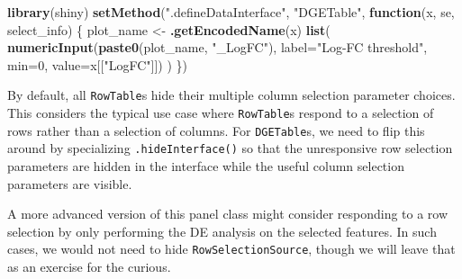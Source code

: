 \documentclass[
]{book}
\newenvironment{Shaded}{\begin{snugshade}}{\end{snugshade}}
\newcommand{\ControlFlowTok}[1]{\textcolor[rgb]{0.13,0.29,0.53}{\textbf{#1}}}
\newcommand{\DataTypeTok}[1]{\textcolor[rgb]{0.13,0.29,0.53}{#1}}
\newcommand{\DecValTok}[1]{\textcolor[rgb]{0.00,0.00,0.81}{#1}}
\newcommand{\KeywordTok}[1]{\textcolor[rgb]{0.13,0.29,0.53}{\textbf{#1}}}
\newcommand{\NormalTok}[1]{#1}
\newcommand{\OperatorTok}[1]{\textcolor[rgb]{0.81,0.36,0.00}{\textbf{#1}}}
\newcommand{\OtherTok}[1]{\textcolor[rgb]{0.56,0.35,0.01}{#1}}
\newcommand{\StringTok}[1]{\textcolor[rgb]{0.31,0.60,0.02}{#1}}
\begin{document}
\begin{Shaded}
\begin{Highlighting}[]
\KeywordTok{library}\NormalTok{(shiny)}
\KeywordTok{setMethod}\NormalTok{(}\StringTok{".defineDataInterface"}\NormalTok{, }\StringTok{"DGETable"}\NormalTok{, }\ControlFlowTok{function}\NormalTok{(x, se, select_info) \{}
\NormalTok{    plot_name <-}\StringTok{ }\KeywordTok{.getEncodedName}\NormalTok{(x)}
    \KeywordTok{list}\NormalTok{(}
        \KeywordTok{numericInput}\NormalTok{(}\KeywordTok{paste0}\NormalTok{(plot_name, }\StringTok{"_LogFC"}\NormalTok{), }\DataTypeTok{label=}\StringTok{"Log-FC threshold"}\NormalTok{,}
            \DataTypeTok{min=}\DecValTok{0}\NormalTok{, }\DataTypeTok{value=}\NormalTok{x[[}\StringTok{"LogFC"}\NormalTok{]])}
\NormalTok{    )}
\NormalTok{\})}
\end{Highlighting}
\end{Shaded}

By default, all \texttt{RowTable}s hide their multiple column selection parameter choices.
This considers the typical use case where \texttt{RowTable}s respond to a selection of rows rather than a selection of columns.
For \texttt{DGETable}s, we need to flip this around by specializing \texttt{.hideInterface()} so that the unresponsive row selection parameters are hidden in the interface while the useful column selection parameters are visible.

\begin{Shaded}
\end{Shaded}

A more advanced version of this panel class might consider responding to a row selection by only performing the DE analysis on the selected features.
In such cases, we would not need to hide \texttt{RowSelectionSource}, though we will leave that as an exercise for the curious.
\end{document}
